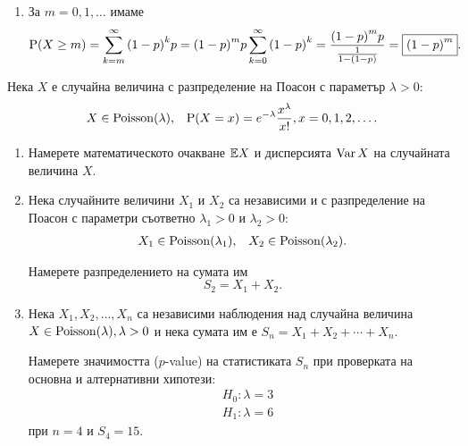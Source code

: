 \documentclass[numbers=endperiod, DIV=15, bibliography=totocnumbered]{scrartcl}
\begin{document}
\begin{solution}
\begin{enumerate}[label=\alph*)]
    \item За $m = 0, 1, \ldots$ имаме
    \begin{displaymath}
      \operatorname{P}(X \geq m)
      =
      \sum_{k=m}^\infty {(1-p)}^k p
      =
      {(1-p)}^m p \sum_{k=0}^\infty {(1-p)}^k
      =
      \frac {{(1-p)}^m p} {\frac 1 {1-(1-p)}}
      =
      \boxed{{(1-p)}^m}.
    \end{displaymath}
  \end{enumerate}
\end{solution}

\begin{exercise}\label{ex:se-summer2016}
  Нека $X$ е случайна величина с разпределение на Поасон с параметър $\lambda > 0$:
  \begin{align*}
    X \in \operatorname{Poisson}(\lambda),
    &&
    \operatorname{P}(X = x) = e^{-\lambda} \frac {x^\lambda} {x!}, x = 0, 1, 2, \ldots.
  \end{align*}

  \begin{enumerate}[label=\alph*)]
    \item Намерете математическото очакване $\mathbb{E} X$ и дисперсията $\operatorname{Var} X$ на случайната величина $X$.
    \item Нека случайните величини $X_1$ и $X_2$ са независими и с разпределение на Поасон с параметри съответно $\lambda_1 > 0$ и $\lambda_2 > 0$:
    \begin{align*}
      X_1 \in \operatorname{Poisson}(\lambda_1),
      &&
      X_2 \in \operatorname{Poisson}(\lambda_2).
    \end{align*}

    Намерете разпределението на сумата им
    \begin{displaymath}
      S_2 = X_1 + X_2.
    \end{displaymath}

    \item Нека $X_1, X_2, \ldots, X_n$ са независими наблюдения над случайна величина $X \in \operatorname{Poisson}(\lambda), \lambda > 0$ и нека сумата им е $S_n = X_1 + X_2 + \cdots + X_n$.

    Намерете значимостта ($p$-value) на статистиката $S_n$ при проверката на основна и алтернативни хипотези:
    \begin{align*}
      &H_0: \lambda = 3 \\
      &H_1: \lambda = 6
    \end{align*}
    при $n = 4$ и $S_4 = 15$.
  \end{enumerate}
\end{exercise}
\end{document}
